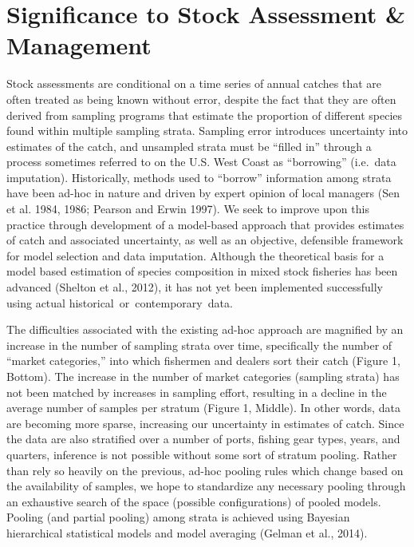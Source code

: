 \documentclass[12pt]{article}
\begin{document}
%
%

%
\section{Significance to Stock Assessment \& Management}\label{significance}
Stock assessments are conditional on a time series of annual catches that are
often treated as being known without error, despite the fact that they are 
often derived from sampling programs that estimate the proportion of different
species found within multiple sampling strata. Sampling error introduces
uncertainty into estimates of the catch, and unsampled strata must be ``filled
in'' through a process sometimes referred to on the U.S. West Coast as
``borrowing'' (i.e.~data imputation). Historically, methods used to
``borrow'' information among strata have been ad-hoc in nature and
driven by expert opinion of local managers (Sen et al. 1984, 1986; Pearson and 
Erwin 1997). We seek to improve upon this practice through development of a
model-based approach that provides estimates of catch and associated 
uncertainty, as well as an objective, defensible framework for model selection 
and data imputation. Although the theoretical basis for a model based 
estimation of species composition in mixed stock fisheries has been advanced 
(Shelton et al., 2012), it has not yet been implemented successfully using 
actual \mbox{historical or contemporary data.}

%
The difficulties associated with the existing ad-hoc approach are
magnified by an increase in the number of sampling strata over time,
specifically the number of ``market categories,'' into which fishermen
and dealers sort their catch (Figure 1, Bottom). The increase in the
number of market categories (sampling strata) has not been matched by
increases in sampling effort, resulting in a decline in the average
number of samples per stratum (Figure 1, Middle). In other words, data
are becoming more sparse, increasing our uncertainty in estimates of
catch. Since the data are also stratified over a number of ports,
fishing gear types, years, and quarters, inference is not possible
without some sort of stratum pooling. Rather than rely so heavily on the
previous, ad-hoc pooling rules which change based on the availability of
samples, we hope to standardize any necessary pooling through an
exhaustive search of the space (possible configurations) of pooled
models. Pooling (and partial pooling) among strata is achieved using
Bayesian hierarchical statistical models and model averaging (Gelman et
al., 2014).
\end{document}
